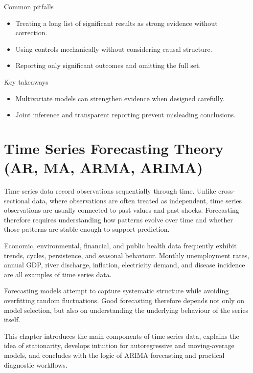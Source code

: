 \documentclass[
  11pt,
  oneside]{book}
\providecommand{\tightlist}{%
  \setlength{\itemsep}{0pt}\setlength{\parskip}{0pt}}
\begin{document}
Common pitfalls

\begin{itemize}
\tightlist
\item
  Treating a long list of significant results as strong evidence without correction.
\item
  Using controls mechanically without considering causal structure.
\item
  Reporting only significant outcomes and omitting the full set.
\end{itemize}

Key takeaways

\begin{itemize}
\tightlist
\item
  Multivariate models can strengthen evidence when designed carefully.
\item
  Joint inference and transparent reporting prevent misleading conclusions.
\end{itemize}

\chapter{Time Series Forecasting Theory (AR, MA, ARMA, ARIMA)}\label{time-series}

Time series data record observations sequentially through time. Unlike cross-sectional data, where observations are often treated as independent, time series observations are usually connected to past values and past shocks. Forecasting therefore requires understanding how patterns evolve over time and whether those patterns are stable enough to support prediction.

Economic, environmental, financial, and public health data frequently exhibit trends, cycles, persistence, and seasonal behaviour. Monthly unemployment rates, annual GDP, river discharge, inflation, electricity demand, and disease incidence are all examples of time series data.

Forecasting models attempt to capture systematic structure while avoiding overfitting random fluctuations. Good forecasting therefore depends not only on model selection, but also on understanding the underlying behaviour of the series itself.

This chapter introduces the main components of time series data, explains the idea of stationarity, develops intuition for autoregressive and moving-average models, and concludes with the logic of ARIMA forecasting and practical diagnostic workflows.
\end{document}
